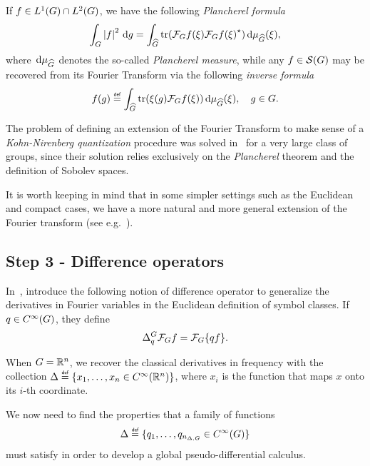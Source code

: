 If $f \in \Lebesgue 1 \Group \cap \Lebesgue 2 \Group$,
we have the following \emph{Plancherel formula}
\begin{align*}
    \int_\Group \abs f^2 \dd g
    = \int_{\dualGroup \Group}
    \tr(\Fourier f(\xi) \adj{\Fourier f(\xi)})
    \dd \mu_{\dualGroup \Group}(\xi),
\end{align*}
where $\dd \mu_{\dualGroup \Group}$ denotes the so-called \emph{Plancherel measure},
while any $f \in \Schwartz \Group$ may be recovered from its Fourier Transform via
the following \emph{inverse formula}
\begin{align*}
    f(g) \defeq
    \int_{\dualGroup \Group}
    \tr(\xi(g) \Fourier f(\xi))
    \dd \mu_{\dualGroup \Group}(\xi),
    \quad g \in \Group.
\end{align*}

The problem of defining an extension of the Fourier Transform to make sense of a \emph{Kohn-Nirenberg quantization} procedure was solved in~\cite[Subsection 5.1.1]{FischerRuzhansky16} for a very large class of groups,
since their solution relies exclusively on the \emph{Plancherel} theorem and the definition of Sobolev spaces.

It is worth keeping in mind that in some simpler settings such as the Euclidean and compact cases,
we have a more natural and more general extension of the Fourier transform
(see e.g.~\cite{RuzhanskyTurunen10}).

\subsection*{Step 3 - Difference operators}

In~\cite{RuzhanskyTurunen10},
\citeauthor{RuzhanskyTurunen10} introduce the following notion of difference operator
to generalize the derivatives in Fourier variables in the Euclidean definition of symbol classes.
If $q \in \SmoothFunctions \Group$,
they define
\begin{align*}
    \DifferenceOperator [\Group] q \Fourier f = \Fourier \{q f\}.
\end{align*}

When $\Group = \R^n$,
we recover the classical derivatives in frequency with the collection
$\Delta \defeq \{x_1, \dots, x_n \in \SmoothFunctions {\R^n}\}$,
where $x_i$ is the function that maps $x$ onto its $i$-th coordinate.

We now need to find the properties that a family of functions
\begin{align*}
    \Delta \defeq \{q_1, \dots, q_{\dimDifferenceOperators} \in \SmoothFunctions \Group\}
\end{align*}
must satisfy in order to develop a global pseudo-differential calculus.

